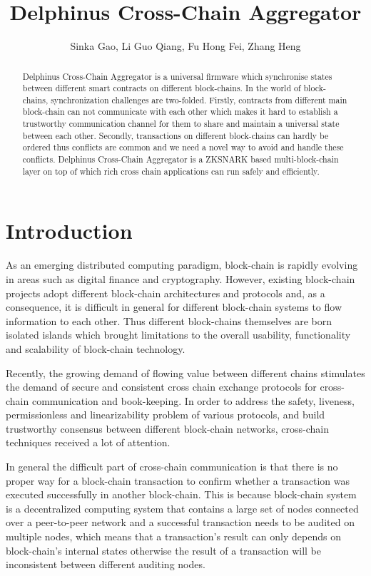 \documentclass[pageno]{jpaper}
\begin{document}
\title{Delphinus Cross-Chain Aggregator}
\author{Sinka Gao, Li Guo Qiang, Fu Hong Fei, Zhang Heng}
\newcommand{\dprotocol}{Delphinus Cross-Chain Aggregator }
\date{}
\maketitle
\thispagestyle{empty}
\begin{abstract}
\dprotocol is a universal firmware which synchronise states between different smart contracts on different block-chains. In the world of block-chains, synchronization challenges are two-folded. Firstly, contracts from different main block-chain can not communicate with each other which makes it hard to establish a trustworthy communication channel for them to share and maintain a universal state between each other. Secondly, transactions on different block-chains can hardly be ordered thus conflicts are common and we need a novel way to avoid and handle these conflicts. \dprotocol is a ZKSNARK based multi-block-chain layer on top of which rich cross chain applications can run safely and efficiently.
\end{abstract}

\section{Introduction}
As an emerging distributed computing paradigm, block-chain is rapidly evolving in areas such as digital finance and cryptography. However, existing block-chain projects adopt different block-chain architectures and protocols and, as a consequence, it is difficult in general for different block-chain systems to flow information to each other. Thus different block-chains themselves are born isolated islands which brought limitations to the overall usability, functionality and scalability of block-chain technology. \cite{anati2013innovative}

Recently, the growing demand of flowing value between different chains stimulates the demand of secure and consistent cross chain exchange protocols for cross-chain communication and book-keeping.  In order to address the safety, liveness, permissionless and linearizability problem of various protocols, and build trustworthy consensus between different block-chain networks, cross-chain techniques received a lot of attention.

In general the difficult part of cross-chain communication is that there is no proper way for a block-chain transaction to confirm whether a transaction was executed successfully in another block-chain. This is because block-chain system is a decentralized computing system that contains a large set of nodes connected over a peer-to-peer network and a successful transaction needs to be audited on multiple nodes, which means that a transaction's result can only depends on block-chain's internal states otherwise the result of a transaction will be inconsistent between different auditing nodes. 
\end{document}
